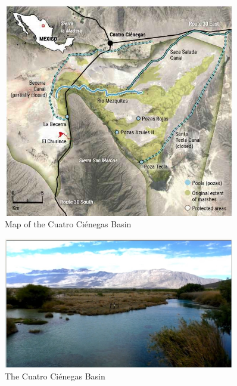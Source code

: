 \documentclass[]{article}
\begin{document}
\begin{figure}[H]
	\caption[Map of the Cuatro Ci\'enegas Basin]{Map of the Cuatro Ci\'enegas Basin\cite{perezortega2020pools}}\label{fig:CuatroCienegasMap}
	\includegraphics[width=0.9\textwidth]{CuatroCienegasMap}
\end{figure}

\begin{figure}[H]
	\caption{The Cuatro Ci\'enegas Basin}\label{fig:CuatroCienegas1}
	\includegraphics[width=0.9\textwidth]{CuatroCienegas1}
\end{figure}
\end{document}
